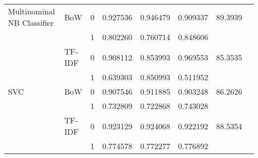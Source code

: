 \begin{tabular}{llllrrrl}
   Multinominal NB Classifier &               BoW &     0 &  0.927536 &   0.946479 &  0.909337 &  89.3939 \\
                              &                   &     1 &  0.802260 &   0.760714 &  0.848606 &          \\
                              &            TF-IDF &     0 &  0.908112 &   0.853993 &  0.969553 &  85.3535 \\
                              &                   &     1 &  0.639303 &   0.850993 &  0.511952 &          \\
                          SVC &               BoW &     0 &  0.907546 &   0.911885 &  0.903248 &  86.2626 \\
                              &                   &     1 &  0.732809 &   0.722868 &  0.743028 &          \\
                              &            TF-IDF &     0 &  0.923129 &   0.924068 &  0.922192 &  88.5354 \\
                              &                   &     1 &  0.774578 &   0.772277 &  0.776892 &          \\
\bottomrule
\end{tabular}
